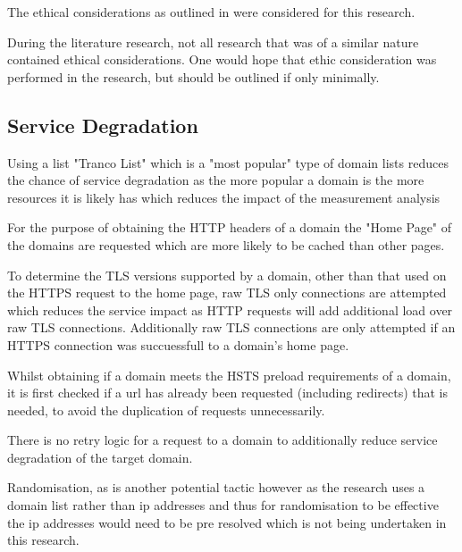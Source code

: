 \documentclass{mscreport}
\begin{document}
\vspace{0.3cm} \noindent
The ethical considerations as outlined in \cite{Amann2017-co,Partridge2016-ph,Durumeric2015-zq,Kumar2017-qw} were considered for this research.

\vspace{0.3cm} \noindent
During the literature research, not all research that was of a similar nature contained ethical considerations. One would hope that ethic consideration was performed in the research, but should be outlined if only minimally.

\subsection{Service Degradation}

Using a list "Tranco List" which is a "most popular" type of domain lists reduces the chance of service degradation as the more popular a domain is the more resources it is likely has which reduces the impact of the measurement analysis

\vspace{0.3cm} \noindent
For the purpose of obtaining the HTTP headers of a domain the "Home Page" of the domains are requested which are more likely to be cached than other pages.

\vspace{0.3cm} \noindent
To determine the TLS versions supported by a domain, other than that used on the HTTPS request to the home page, raw TLS only connections are attempted which reduces the service impact as HTTP requests will add additional load over raw TLS connections. Additionally raw TLS connections are only attempted if an HTTPS connection was succuessfull to a domain's home page.

\vspace{0.3cm} \noindent
Whilst obtaining if a domain meets the HSTS preload requirements of a domain, it is first checked if a url has already been requested (including redirects) that is needed, to avoid the duplication of requests unnecessarily.

\vspace{0.3cm} \noindent
There is no retry logic for a request to a domain to additionally reduce service degradation of the target domain.

\vspace{0.3cm} \noindent
Randomisation, as  is another potential tactic however as the research uses a domain list rather than ip addresses and thus for randomisation to be effective the ip addresses would need to be pre resolved which is not being undertaken in this research.
\end{document}
